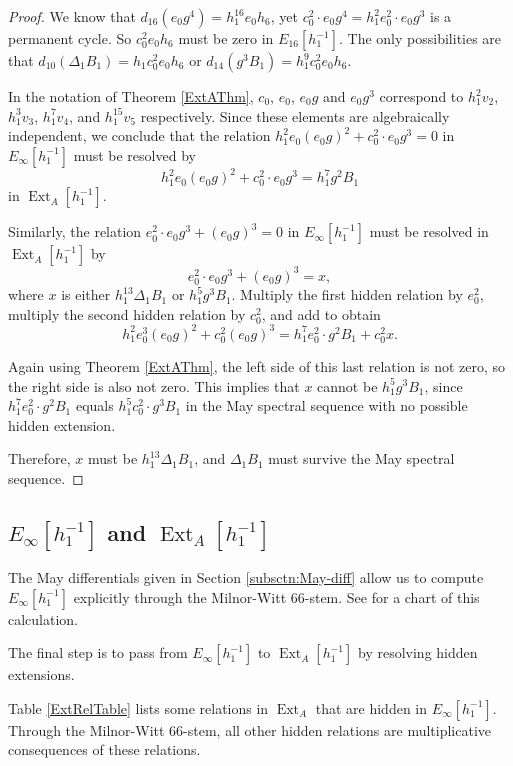 \documentclass[10pt]{amsart}
\begin{document}
\begin{proof}
We know that $d_{16}(e_0g^4) = h_1^{16} e_0h_6$, yet 
$c_0^2\cdot e_0g^4 = h_1^{2} e_0^2 \cdot e_0g^3$ is a permanent cycle. 
So $c_0^2e_0 h_6$ must be zero in $E_{16}[h_1^{-1}]$. 
The only possibilities are that 
$d_{10}(\Delta_1B_1) = h_1 c_0^2e_0h_6$
or $d_{14}(g^3B_1) = h_1^{9} c_0^2e_0 h_6$.

In the notation of Theorem \ref{ExtAThm},
$c_0$, $e_0$, $e_0 g$ and $e_0 g^3$ correspond to 
$h_1^2v_2$, $h_1^3 v_3$, $h_1^7 v_4$, and $h_1^{15} v_5$ respectively.
Since these elements are algebraically independent, we conclude that
the relation 
$ h_1^2e_0 (e_0 g)^2 + c_0^2 \cdot e_0 g^3 = 0$
in $E_\infty[h_1^{-1}]$ must be resolved by
\[
h_1^2 e_0 (e_0 g)^2 + c_0^2 \cdot e_0 g^3 = h_1^7 g^2 B_1
\]
in $\operatorname{Ext}_A[h_1^{-1}]$.

Similarly, the relation
$e_0^2 \cdot e_0g^3 + (e_0g)^3 = 0$ in $E_\infty[h_1^{-1}]$
must be resolved in $\operatorname{Ext}_A[h_1^{-1}]$ by 
\[
e_0^2 \cdot e_0g^3 + (e_0g)^3 = x,
\]
where $x$ is either $h_1^{13} \Delta_1 B_1$ or $h_1^5 g^3 B_1$.
Multiply the first hidden relation by $e_0^2$,
multiply the second hidden relation by $c_0^2$, and add to obtain
\[
h_1^2 e_0^3 (e_0 g)^2 + c_0^2 (e_0 g)^3 = h_1^7 e_0^2 \cdot g^2 B_1 + c_0^2 x.
\]

Again using Theorem \ref{ExtAThm},
the left side of this last relation is not zero, so the right side is also
not zero.
This implies that $x$ cannot be $h_1^5 g^3 B_1$, since
$h_1^7 e_0^2 \cdot g^2 B_1$ equals $h_1^5 c_0^2\cdot g^3 B_1$ in the 
May spectral sequence with no possible hidden extension.

Therefore, $x$ must be $h_1^{13} \Delta_1 B_1$, and
$\Delta_1 B_1$ must survive the May spectral sequence.
\end{proof}

\subsection{$E_\infty[h_1^{-1}]$ and $\operatorname{Ext}_A[h_1^{-1}]$}

The May differentials given in Section \ref{subsctn:May-diff} allow us to
compute $E_\infty[h_1^{-1}]$ explicitly through the Milnor-Witt 66-stem.
See \cite{GI} for a chart of this calculation.

The final step is to pass from $E_\infty[h_1^{-1}]$ to $\operatorname{Ext}_A[h_1^{-1}]$
by resolving hidden extensions. 

\begin{prop}
\label{prop:HiddenRels}
Table \ref{ExtRelTable} lists some relations in $\operatorname{Ext}_A$
that are hidden in $E_\infty[h_1^{-1}]$.
Through the Milnor-Witt 66-stem,
all other hidden relations are multiplicative consequences of these relations.
\end{prop}
\end{document}
